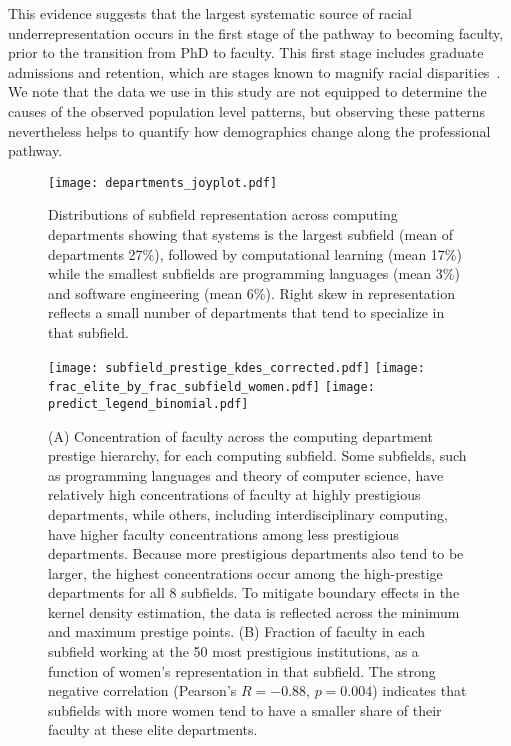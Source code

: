 \documentclass[reprint, twocolumn, aps, nofootinbib, superscriptaddress, longbibliography]{revtex4-1}
\begin{document}
This evidence suggests that the largest systematic source of racial underrepresentation occurs in the first stage of the pathway to becoming faculty, prior to the transition from PhD to faculty. This first stage includes graduate admissions and retention, which are stages known to magnify racial disparities~\cite{computing2020taulbee, mcgee2020interrogating, posselt2020equity}. We note that the data we use in this study are not equipped to determine the causes of the observed population level patterns, but observing these patterns nevertheless helps to quantify how demographics change along the professional pathway. 

\begin{figure}[b] 
\texttt{[image: departments\_joyplot.pdf]} 
\caption{Distributions of subfield representation across computing departments showing that systems is the largest subfield (mean of departments 27\%), followed by computational learning (mean 17\%) while the smallest subfields are programming languages (mean 3\%) and software engineering (mean 6\%). Right skew in representation reflects a small number of departments that tend to specialize in that subfield.}\label{fig:departments_joyplot} 
\end{figure} 

\begin{figure*}[t] 
\texttt{[image: subfield\_prestige\_kdes\_corrected.pdf]} 
\texttt{[image: frac\_elite\_by\_frac\_subfield\_women.pdf]} 
\texttt{[image: predict\_legend\_binomial.pdf]} 
\caption{(A) Concentration of faculty across the computing department prestige hierarchy, for each computing subfield. Some subfields, such as programming languages and theory of computer science, have relatively high concentrations of faculty at highly prestigious departments, while others, including interdisciplinary computing, have higher faculty concentrations among less prestigious departments. Because more prestigious departments also tend to be larger, the highest concentrations occur among the high-prestige departments for all 8 subfields. To mitigate boundary effects in the kernel density estimation, the data is reflected across the minimum and maximum prestige points. (B) Fraction of faculty in each subfield working at the 50 most prestigious institutions, as a function of women's representation in that subfield. The strong negative correlation (Pearson’s $R= -0.88$, $p = 0.004$) indicates that subfields with more women tend to have a smaller share of their faculty at these elite departments.}\label{fig:prestige_histogram} 
\end{figure*} 
\end{document}
